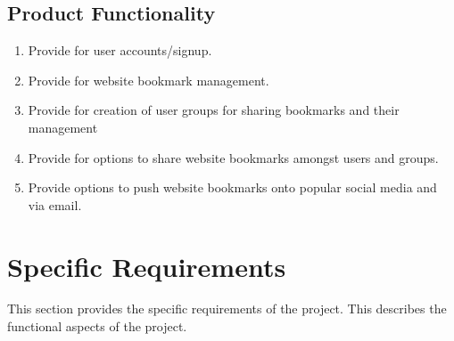 \documentclass[11pt]{report} %
\begin{document}
\section{Product Functionality}
\begin{enumerate}
\item
Provide for user accounts/signup.
\item
Provide for website bookmark management.
\item
Provide for creation of user groups for sharing bookmarks and their management
\item
Provide for options to share website bookmarks amongst users and groups.
\item
Provide options to push website bookmarks onto popular social media and via email.
\end{enumerate}

\maketitle
\chapter{Specific Requirements}
This section provides the specific requirements of the project. This describes the functional aspects of the project.
\end{document}
